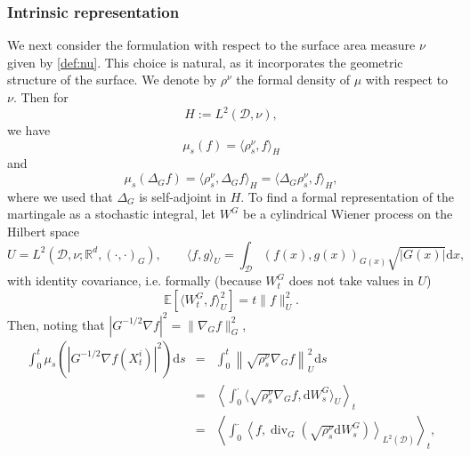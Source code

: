 \documentclass[11pt, a4paper]{article}
\newcommand{\mathd}{\mathrm{d}}
\begin{document}
\subsubsection{Intrinsic representation}

We next consider the formulation with respect to the surface area measure 
 $\nu$ given by \eqref{def:nu}. This choice is natural, as it incorporates the geometric structure of the surface. We denote by $\rho^\nu$  the formal density of $\mu$ with respect to $\nu$. Then for
\begin{equation}\label{defHsurface}
    H := L^2(\mathcal{D}, \nu),
\end{equation}
we have
\begin{equation}\label{eq:sDK-Intrinsic-f}
    \mu_s(f) = \langle \rho^\nu_s, f\rangle_{H}
\end{equation}
 and
\begin{equation}\label{eq:sDK-Intrinsic-Laplacian}
    \mu_s(\Delta_G f) = \langle \rho^\nu_s, \Delta_G f\rangle_{H} = \langle \Delta_G \rho^\nu_s, f\rangle_{H},
\end{equation}
where we used that $\Delta_G$ is self-adjoint in $H$. To find a formal representation of the martingale as a stochastic integral, let $W^G$ be a cylindrical Wiener process on the Hilbert space
\begin{equation}\label{def:Usurface}
        U=L^2(\mathcal{D},\nu; \mathbb R^d, (\cdot, \cdot)_G),\qquad \langle f, g\rangle_U = \int_\mathcal{D} (f(x), g(x))_{G(x)} \sqrt{|G(x)|}\mathd x,
\end{equation}
with identity covariance, i.e. formally (because $W^G_t$ does not take values in $U$)
\begin{equation}\label{Wg_stat}
        \mathbb E[\langle W^G_t, f\rangle_U^2] = t \| f\|_U^2 .
\end{equation}
Then, noting that $|G^{-1/2} \nabla f|^2 = \|\nabla_G f\|_G^2$,
\begin{eqnarray}\nonumber
  \int_0^t \mu_s (| G^{- 1 / 2} \nabla f (X^i_t) |^2) \mathd s & = & \int_{0}^t \left\| \sqrt{\rho^{\nu}_s} 
  \nabla_G f \right\|_U^2 \mathd s\\ \nonumber
  & = & \left\langle \int_{0}^\cdot \langle \sqrt{\rho^{\nu}_s} 
  \nabla_G f, \mathd W^G_s\rangle_U\right\rangle_t\\
  & = & \left\langle \int_{0}^\cdot \left\langle f, \operatorname{div}_G (\sqrt{\rho^{\nu}_s} \mathd W^G_s)\right\rangle_{L^2(\mathcal{D})}\right\rangle_t, \label{eq:sDK-Intrinsic-Noise}
\end{eqnarray}
\end{document}
